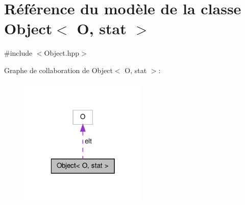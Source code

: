 \hypertarget{class_object}{\section{Référence du modèle de la classe Object$<$ O, stat $>$}
\label{class_object}
}


{\ttfamily \#include $<$Object.\-hpp$>$}



Graphe de collaboration de Object$<$ O, stat $>$\-:\nopagebreak
\begin{figure}[H]
\begin{center}
\leavevmode
\includegraphics[width=172pt]{class_object__coll__graph}
\end{center}
\end{figure}
